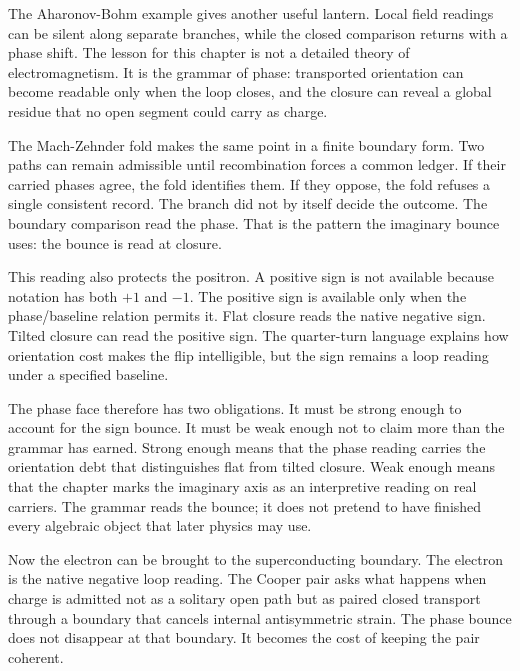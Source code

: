 The Aharonov-Bohm example gives another useful lantern. Local field readings
can be silent along separate branches, while the closed comparison returns
with a phase shift. The lesson for this chapter is not a detailed theory of
electromagnetism. It is the grammar of phase: transported orientation can
become readable only when the loop closes, and the closure can reveal a
global residue that no open segment could carry as charge.

The Mach-Zehnder fold makes the same point in a finite boundary form. Two
paths can remain admissible until recombination forces a common ledger. If
their carried phases agree, the fold identifies them. If they oppose, the
fold refuses a single consistent record. The branch did not by itself decide
the outcome. The boundary comparison read the phase. That is the pattern the
imaginary bounce uses: the bounce is read at closure.

This reading also protects the positron. A positive sign is not available
because notation has both \(+1\) and \(-1\). The positive sign is available
only when the phase/baseline relation permits it. Flat closure reads the
native negative sign. Tilted closure can read the positive sign. The
quarter-turn language explains how orientation cost makes the flip
intelligible, but the sign remains a loop reading under a specified baseline.

The phase face therefore has two obligations. It must be strong enough to
account for the sign bounce. It must be weak enough not to claim more than
the grammar has earned. Strong enough means that the phase reading carries
the orientation debt that distinguishes flat from tilted closure. Weak
enough means that the chapter marks the imaginary axis as an interpretive
reading on real carriers. The grammar reads the bounce; it does not pretend
to have finished every algebraic object that later physics may use.

Now the electron can be brought to the superconducting boundary. The
electron is the native negative loop reading. The Cooper pair asks what
happens when charge is admitted not as a solitary open path but as paired
closed transport through a boundary that cancels internal antisymmetric
strain. The phase bounce does not disappear at that boundary. It becomes the
cost of keeping the pair coherent.
